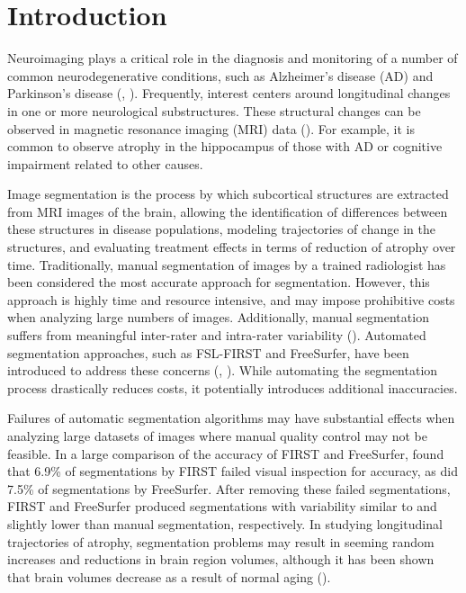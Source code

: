 \documentclass[11pt,reqno]{article}
\theoremstyle{definition}
\begin{document}
\section{Introduction}

Neuroimaging plays a critical role in the diagnosis and monitoring of a number of common neurodegenerative conditions, such as Alzheimer's disease (AD) and Parkinson's disease (\cite{knopmanAlzheimerDisease2021}, \cite{poeweParkinsonDisease2017}). Frequently, interest centers around longitudinal changes in one or more neurological substructures. These structural changes can be observed in magnetic resonance imaging (MRI) data (\cite{crainiceanu2016tutorial}). For example, it is common to observe atrophy in the hippocampus of those with AD or cognitive impairment related to other causes.

Image segmentation is the process by which subcortical structures are extracted from MRI images of the brain, allowing the identification of differences between these structures in disease populations, modeling trajectories of change in the structures, and evaluating treatment effects in terms of reduction of atrophy over time. Traditionally, manual segmentation of images by a trained radiologist has been considered the most accurate approach for segmentation. However, this approach is highly time and resource intensive, and may impose prohibitive costs when analyzing large numbers of images. Additionally, manual segmentation suffers from meaningful inter-rater and intra-rater variability (\cite{boccardiSurveyProtocolsManual2011}). Automated segmentation approaches, such as FSL-FIRST and FreeSurfer, have been introduced to address these concerns (\cite{patenaudeBayesianModelShape2011}, \cite{reuterWithinsubjectTemplateEstimation2012}). While automating the segmentation process drastically reduces costs, it potentially introduces additional inaccuracies.

Failures of automatic segmentation algorithms may have substantial effects when analyzing large datasets of images where manual quality control may not be feasible. In a large comparison of the accuracy of FIRST and FreeSurfer, \cite{mulderHippocampalVolumeChange2014} found that 6.9\% of segmentations by FIRST failed visual inspection for accuracy, as did 7.5\% of segmentations by FreeSurfer. After removing these failed segmentations, FIRST and FreeSurfer produced segmentations with variability similar to and slightly lower than manual segmentation, respectively. In studying longitudinal trajectories of atrophy, segmentation problems may result in seeming random increases and reductions in brain region volumes, although it has been shown that brain volumes decrease as a result of normal aging (\cite{scahill2003longitudinal}).
\end{document}

